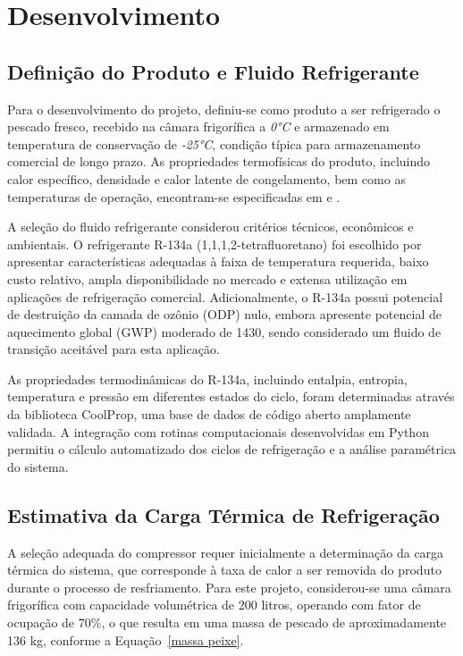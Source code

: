 \chapter{Desenvolvimento}

\section{Definição do Produto e Fluido Refrigerante}

Para o desenvolvimento do projeto, definiu-se como produto a ser refrigerado o pescado fresco, recebido na câmara frigorífica a \textit{0°C} e armazenado em temperatura de conservação de \textit{-25°C}, condição típica para armazenamento comercial de longo prazo. As propriedades termofísicas do produto, incluindo calor específico, densidade e calor latente de congelamento, bem como as temperaturas de operação, encontram-se especificadas em \cite{calor_especifico_II} e \cite{costa1982refrigeracao}.

A seleção do fluido refrigerante considerou critérios técnicos, econômicos e ambientais. O refrigerante R-134a (1,1,1,2-tetrafluoretano) foi escolhido por apresentar características adequadas à faixa de temperatura requerida, baixo custo relativo, ampla disponibilidade no mercado e extensa utilização em aplicações de refrigeração comercial. Adicionalmente, o R-134a possui potencial de destruição da camada de ozônio (ODP) nulo, embora apresente potencial de aquecimento global (GWP) moderado de 1430, sendo considerado um fluido de transição aceitável para esta aplicação.

As propriedades termodinâmicas do R-134a, incluindo entalpia, entropia, temperatura e pressão em diferentes estados do ciclo, foram determinadas através da biblioteca CoolProp, uma base de dados de código aberto amplamente validada. A integração com rotinas computacionais desenvolvidas em Python permitiu o cálculo automatizado dos ciclos de refrigeração e a análise paramétrica do sistema.

\section{Estimativa da Carga Térmica de Refrigeração}

A seleção adequada do compressor requer inicialmente a determinação da carga térmica do sistema, que corresponde à taxa de calor a ser removida do produto durante o processo de resfriamento. Para este projeto, considerou-se uma câmara frigorífica com capacidade volumétrica de 200 litros, operando com fator de ocupação de 70\%, o que resulta em uma massa de pescado de aproximadamente 136 kg, conforme a Equação~\ref{massa peixe}.

